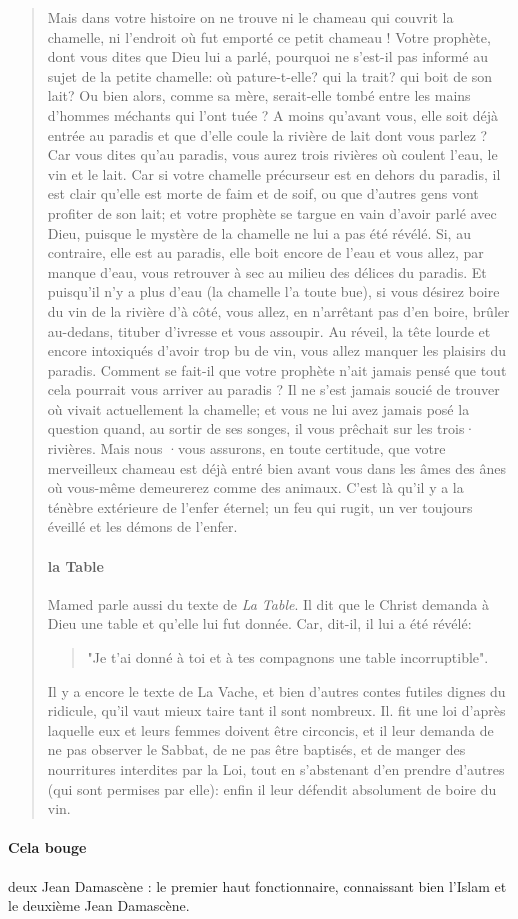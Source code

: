\begin{quote}
Mais dans votre histoire on ne trouve ni le chameau qui couvrit la chamelle, ni l'endroit où fut emporté ce petit chameau ! Votre prophète, dont vous dites que Dieu lui a parlé, pourquoi ne s'est-il pas informé au sujet de la petite chamelle: où pature-t-elle? qui la trait? qui boit de son lait? Ou bien alors, comme sa mère, serait-elle tombé entre les mains d'hommes méchants qui l'ont tuée ? A moins qu'avant vous, elle soit déjà entrée au paradis et que d'elle coule la rivière de lait dont vous parlez ? Car vous dites qu'au paradis, vous aurez trois rivières où coulent l'eau, le vin et le lait. Car si votre chamelle précurseur est en dehors du paradis, il est clair qu'elle est morte de faim et de soif, ou que d'autres gens vont profiter de son lait; et votre prophète se targue en vain d'avoir parlé avec Dieu, puisque le mystère de la chamelle ne lui a pas été révélé. Si, au contraire, elle est au paradis, elle boit encore de l'eau et vous allez, par manque d'eau, vous retrouver à sec au milieu des délices du paradis. Et puisqu'il n'y a plus d'eau (la chamelle l'a toute bue), si vous désirez boire du vin de la rivière d'à côté, vous allez, en n'arrêtant pas d'en boire, brûler au-dedans, tituber d'ivresse et vous assoupir. Au réveil, la tête lourde et encore intoxiqués d'avoir trop bu de vin, vous allez manquer les plaisirs du paradis. Comment se fait-il que votre prophète n'ait jamais pensé que tout cela pourrait vous arriver au paradis ? Il ne s'est jamais soucié de trouver où vivait actuellement la chamelle; et vous ne lui avez jamais posé la question quand, au sortir de ses songes, il vous prêchait sur les trois· rivières. Mais nous ·vous assurons, en toute certitude, que votre merveilleux chameau est déjà entré bien avant vous dans les âmes des ânes où vous-même demeurerez comme des animaux. C'est là qu'il y a la ténèbre extérieure de l'enfer éternel; un feu qui rugit, un ver toujours éveillé et les démons de l'enfer.
\paragraph{la Table}
Mamed parle aussi du texte de \textit{La Table}. Il dit que le Christ demanda à Dieu une table et qu'elle lui fut donnée. Car, dit-il, il lui a été révélé: \begin{quote}
    "Je t'ai donné à toi et à tes compagnons une table incorruptible".
\end{quote}

Il y a encore le texte de La Vache, et bien d'autres contes futiles dignes du ridicule, qu'il vaut mieux taire tant il sont nombreux. Il. fit une loi d'après laquelle eux et leurs femmes doivent être circoncis, et il leur demanda de ne pas observer le Sabbat, de ne pas être baptisés, et de manger des nourritures interdites par la Loi, tout en s'abstenant d'en prendre d'autres (qui sont permises par elle): enfin il leur défendit absolument de boire du vin.


\end{quote}


\paragraph{Cela bouge} deux Jean Damascène : le premier haut fonctionnaire, connaissant bien l'Islam et le deuxième Jean Damascène. 